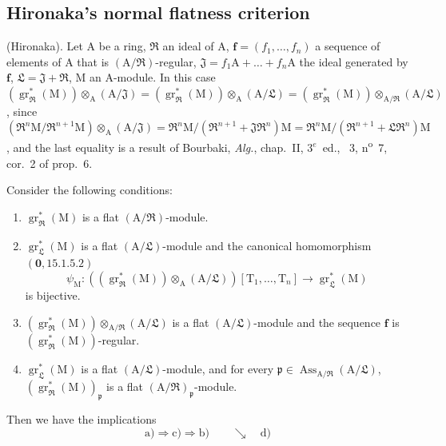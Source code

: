 \subsection{Hironaka's normal flatness criterion}
\label{subsection:IV.19.7}

\begin{theorem}[19.7.1]
\label{IV.19.7.1}
\textup{(Hironaka).}
Let $\mathrm{A}$ be a ring, $\mathfrak{R}$ an ideal of $\mathrm{A}$, $\mathbf{f}=(f_1,\ldots,f_n)$ a sequence of elements of $\mathrm{A}$ that is $(\mathrm{A}/\mathfrak{R})$-regular, $\mathfrak{J}=f_1\mathrm{A}+\ldots+f_n\mathrm{A}$ the ideal generated by $\mathbf{f}$, $\mathfrak{L}=\mathfrak{J}+\mathfrak{R}$, $\mathrm{M}$ an $\mathrm{A}$-module.
In this case $(\operatorname{gr}_\mathfrak{R}^*(\mathrm{M}))\otimes_\mathrm{A}(\mathrm{A}/\mathfrak{J})=(\operatorname{gr}_\mathfrak{R}^*(\mathrm{M}))\otimes_\mathrm{A}(\mathrm{A}/\mathfrak{L})=(\operatorname{gr}_\mathfrak{R}^*(\mathrm{M}))\otimes_{\mathrm{A}/\mathfrak{R}}(\mathrm{A}/\mathfrak{L})$, since $(\mathfrak{R}^n\mathrm{M}/\mathfrak{R}^{n+1}\mathrm{M})\otimes_\mathrm{A}(\mathrm{A}/\mathfrak{J})=\mathfrak{R}^n\mathrm{M}/(\mathfrak{R}^{n+1}+\mathfrak{J}\mathfrak{R}^n)\mathrm{M}=\mathfrak{R}^n\mathrm{M}/(\mathfrak{R}^{n+1}+\mathfrak{L}\mathfrak{R}^n)\mathrm{M}$, and the last equality is a result of Bourbaki, \emph{Alg.}, chap.~II, $3^e$~ed., \textsection~3, n\textsuperscript{o}~7, cor.~2 of prop.~6.

Consider the following conditions:
\begin{enumerate}
\item[\rm a)] $\operatorname{gr}_\mathfrak{R}^*(\mathrm{M})$ is a flat $(\mathrm{A}/\mathfrak{R})$-module.
\item[\rm b)] $\operatorname{gr}_\mathfrak{L}^*(\mathrm{M})$ is a flat $(\mathrm{A}/\mathfrak{L})$-module and the canonical homomorphism $(\mathbf{0},15.1.5.2)$
\[
  \psi_\mathrm{M}:((\operatorname{gr}_\mathfrak{R}^*(\mathrm{M}))\otimes_\mathrm{A}(\mathrm{A}/\mathfrak{L}))[\mathrm{T}_1,\ldots,\mathrm{T}_n]\to\operatorname{gr}_\mathfrak{L}^*(\mathrm{M})
\]
is bijective.
\item[\rm c)] $(\operatorname{gr}_\mathfrak{R}^*(\mathrm{M}))\otimes_{\mathrm{A}/\mathfrak{R}}(\mathrm{A}/\mathfrak{L})$ is a flat $(\mathrm{A}/\mathfrak{L})$-module and the sequence $\mathbf{f}$ is $(\operatorname{gr}_\mathfrak{R}^*(\mathrm{M}))$-regular.
\item[\rm d)] $\operatorname{gr}_\mathfrak{L}^*(\mathrm{M})$ is a flat $(\mathrm{A}/\mathfrak{L})$-module, and for every $\mathfrak{p}\in\operatorname{Ass}_{\mathrm{A}/\mathfrak{R}}(\mathrm{A}/\mathfrak{L})$, $(\operatorname{gr}_\mathfrak{R}^*(\mathrm{M}))_\mathfrak{p}$ is a flat $(\mathrm{A}/\mathfrak{R})_\mathfrak{p}$-module.
\end{enumerate}
Then we have the implications
\[
  \text{a)}\Rightarrow\text{c)}\Rightarrow\text{b)}
  \qquad\searrow\quad\text{d)}
\]


\end{theorem}
